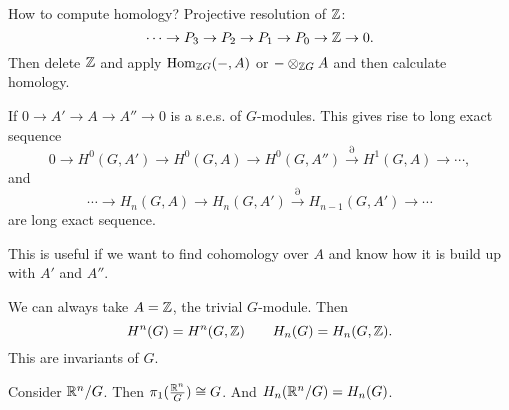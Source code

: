 

How to compute homology? Projective resolution of $\mathbb{Z}$:
\[
\cdots \to  P_3 \to P_2 \to  P_1 \to  P_0 \to  \mathbb{Z} \to  0
.\] 
Then delete $\mathbb{Z}$ and apply $\operatorname{Hom}_{\mathbb{Z} G}(-, A)$ or $- \otimes_{\mathbb{Z} G} A$ and then calculate homology.

\begin{prop}[3.6]
    If $0 \to  A' \to  A \to  A''\to 0$ is a s.e.s. of $G$-modules.
    This gives rise to long exact sequence
    \[
        0 \to  H^{0}(G, A') \to  H^{0}(G, A) \to  H^{0}(G, A'') \xrightarrow{\partial}  H^{1}(G, A)  \to  \cdots
    ,\] 
    and
    \[
        \cdots\to H_n(G,A) \to  H_n(G, A') \xrightarrow{\partial}  H_{n-1}(G, A') \to \cdots
    \] 
    are long exact sequence.
\end{prop}

This is useful if we want to find cohomology over $A$ and know how it is build up with  $A'$ and  $A''$.

\begin{remark}
    We can always take $A = \mathbb{Z}$, the trivial $G$-module.
    Then
    \[
        H^{n}(G)=H^{n}(G, \mathbb{Z}) \qquad H_n(G) = H_n(G, \mathbb{Z})
    .\] 
    This are invariants of $G$.
\end{remark}
\begin{remark}
    Consider $\mathbb{R}^{n} / G$.
    Then $\pi_1(\frac{\mathbb{R}^{n}}{G}) \cong G$.
    And $H_n(\mathbb{R}^{n} / G) = H_n(G)$.
\end{remark}

